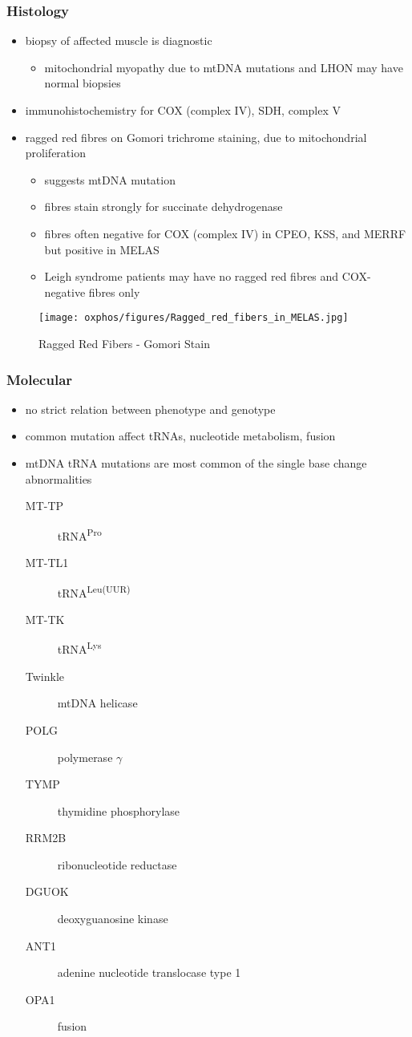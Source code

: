 \documentclass[12pt]{scrartcl}
\begin{document}
\subsubsection{Histology}
\label{sec:orgcac74f5}
\begin{itemize}
\item biopsy of affected muscle is diagnostic
\begin{itemize}
\item mitochondrial myopathy due to mtDNA mutations and LHON may have normal biopsies
\end{itemize}
\item immunohistochemistry for COX (complex IV), SDH, complex V
\item ragged red fibres on Gomori trichrome staining, due to mitochondrial proliferation
\begin{itemize}
\item suggests mtDNA mutation
\item fibres stain strongly for succinate dehydrogenase
\item fibres often negative for COX (complex IV) in CPEO, KSS, and MERRF
but positive in MELAS
\item Leigh syndrome patients may have no ragged red fibres and
COX-negative fibres only
\end{itemize}
\end{itemize}

\begin{figure}[htbp]
\centering
\texttt{[image: oxphos/figures/Ragged\_red\_fibers\_in\_MELAS.jpg]}
\caption[rrf]{\label{fig:org0399e4b}Ragged Red Fibers - Gomori Stain}
\end{figure}

\subsubsection{Molecular}
\label{sec:orgec02b21}
\begin{itemize}
\item no strict relation between phenotype and genotype
\item common mutation affect tRNAs, nucleotide metabolism, fusion
\item mtDNA tRNA mutations are most common of the single base change abnormalities
\begin{description}
\item[{MT-TP}] tRNA\textsuperscript{Pro}
\item[{MT-TL1}] tRNA\textsuperscript{Leu(UUR)}
\item[{MT-TK}] tRNA\textsuperscript{Lys}
\item[{Twinkle}] mtDNA helicase
\item[{POLG}] polymerase \(\gamma\)
\item[{TYMP}] thymidine phosphorylase
\item[{RRM2B}] ribonucleotide reductase
\item[{DGUOK}] deoxyguanosine kinase
\item[{ANT1}] adenine nucleotide translocase type 1
\item[{OPA1}] fusion
\end{description}
\end{itemize}
\end{document}
